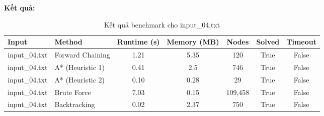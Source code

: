 \begin{center}
\end{center}

\textbf{Kết quả:}
\begin{table}[H]
\centering
\begin{tabular}{|l|l|c|c|c|c|c|}
\hline
\textbf{Input} & \textbf{Method} & \textbf{Runtime (s)} & \textbf{Memory (MB)} & \textbf{Nodes} & \textbf{Solved} & \textbf{Timeout} \\
\hline
input\_04.txt & Forward Chaining & 1.21 & 5.35 & 120 & True & False \\
input\_04.txt & A* (Heuristic 1) & 0.41 & 2.5 & 746 & True & False \\
input\_04.txt & A* (Heuristic 2) & 0.10 & 0.28 & 29 & True & False \\
input\_04.txt & Brute Force & 7.03 & 0.15 & 109,458 & True & False \\
input\_04.txt & Backtracking & 0.02 & 2.37 & 750 & True & False \\
\hline
\end{tabular}
\caption{Kết quả benchmark cho input\_04.txt}
\end{table}

